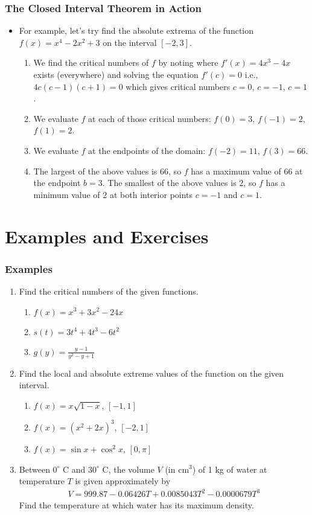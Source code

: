 \documentclass[serif,ignorenonframetext]{beamer}
\newcommand{\ds}{\displaystyle}
\begin{document}
\begin{frame}
  \frametitle{The Closed Interval Theorem in Action}
  \begin{itemize}[<+->]
  \item For example, let's try find the absolute extrema of the 
    function $f(x)=x^4-2x^2+3$ on the interval $[-2,3]$.
    \begin{enumerate}[<+->]
    \item We find the critical numbers of $f$ by noting where $f'(x)=4x^3-4x$
      exists (everywhere) and solving the equation $f'(c)=0$ i.e., 
      $4c(c-1)(c+1)=0$
      which gives critical numbers $c=0$, $c=-1$, $c=1$.
    \item We evaluate $f$ at each of those critical numbers:
      $f(0)=3$, $f(-1)=2$, $f(1)=2$.
    \item We evaluate $f$ at the endpoints of the domain: $f(-2)=11$, $f(3)
      = 66$.
    \item The largest of the above values is $66$, so $f$ has a maximum value
      of $66$ at the endpoint $b=3$.  The smallest of the above values is
      $2$, so $f$ has a minimum value of $2$ at both interior points $c=-1$
      and $c=1$.
    \end{enumerate}
  \end{itemize}
\end{frame}


\section{Examples and Exercises}

\begin{frame}
  \frametitle{Examples}
  \begin{enumerate}
  \item Find the critical numbers of the given functions.
    \begin{enumerate}
    \item $\ds f(x)=x^3+3x^2-24x$
    \item $\ds s(t)=3t^4+4t^3-6t^2$
    \item $\ds g(y)=\frac{y-1}{y^2-y+1}$
    \end{enumerate}
  \item Find the local and absolute extreme values of the
    function on the given interval.
    \begin{enumerate}
    \item $f(x)=x\sqrt{1-x}$, $[-1,1]$
    \item $f(x)=(x^2+2x)^3$, $[-2,1]$
    \item $f(x)=\sin x + \cos^2 x$, $[0,\pi]$
    \end{enumerate}
  \item Between $0^\circ$ C and $30^\circ$ C, the volume $V$ (in cm$^3$) of
    1 kg of water at temperature $T$ is given approximately by
    \begin{align*}
      V = 999.87 - 0.06426 T + 0.0085043 T^2 - 0.0000679 T^3
    \end{align*}
    Find the temperature at which water has its maximum density.
  \end{enumerate} 
\end{frame}
\end{document}
